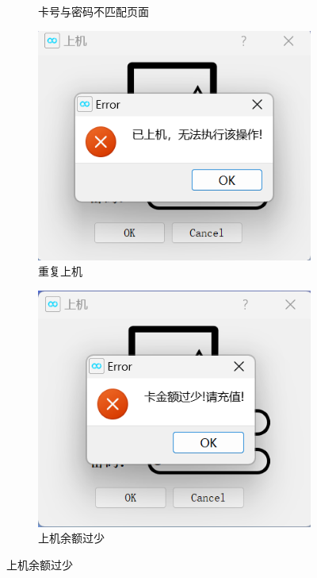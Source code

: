 \documentclass{article}
\begin{document}
\begin{figure}[htbp]
\begin{subfigure}{0.24\linewidth}
            \caption{卡号与密码不匹配页面}
            \label{id_password_error}
        \end{subfigure}
        \centering
        \begin{subfigure}{0.24\linewidth}
            \centering
            \includegraphics[width=\linewidth]{figure/logon_two.png}
            \caption{重复上机}
            \label{logon_repeat}
        \end{subfigure}
        \centering
        \begin{subfigure}{0.24\linewidth}
            \centering
            \includegraphics[width=\linewidth]{figure/logon_less_money.png}
            \caption{上机余额过少}
            \label{logon_less_money}
        \end{subfigure}
    \end{figure}
\end{document}
